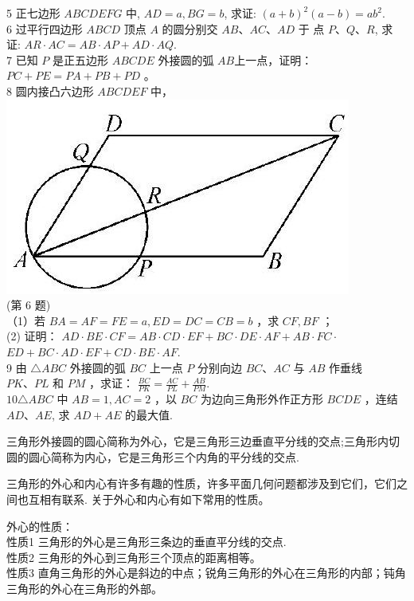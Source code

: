 \documentclass[10pt]{article}
\begin{document}
5 正七边形 $A B C D E F G$ 中, $A D=a, B G=b$, 求证: $(a+b)^{2}(a-b)=a b^{2}$.\\
6 过平行四边形 $A B C D$ 顶点 $A$ 的圆分别交 $A B 、 A C 、 A D$ 于 点 $P 、 Q 、 R$, 求 证: $A R \cdot A C=A B \cdot A P+A D \cdot A Q$.\\
7 已知 $P$ 是正五边形 $A B C D E$ 外接圆的弧 $A B$上一点，证明： $P C+P E=P A+P B+P D$ 。\\
8 圆内接凸六边形 $A B C D E F$ 中，\\
\includegraphics[max width=\textwidth, center]{2024_10_30_66b8e5e701da2093c133g-070}\\
(第 6 题)\\
（1）若 $B A=A F=F E=a, E D=D C=C B=b$ ，求 $C F, B F$ ；\\
(2) 证明： $A D \cdot B E \cdot C F=A B \cdot C D \cdot E F+B C \cdot D E \cdot A F+A B \cdot F C \cdot$ $E D+B C \cdot A D \cdot E F+C D \cdot B E \cdot A F$.\\
9 由 $\triangle A B C$ 外接圆的弧 $B C$ 上一点 $P$ 分别向边 $B C 、 A C$ 与 $A B$ 作垂线 $P K 、 P L$ 和 $P M$ ，求证： $\frac{B C}{P K}=\frac{A C}{P L}+\frac{A B}{P M}$.\\
$10 \triangle A B C$ 中 $A B=1, A C=2$ ，以 $B C$ 为边向三角形外作正方形 $B C D E$ ，连结 $A D 、 A E$, 求 $A D+A E$ 的最大值.

三角形外接圆的圆心简称为外心，它是三角形三边垂直平分线的交点;三角形内切圆的圆心简称为内心，它是三角形三个内角的平分线的交点.

三角形的外心和内心有许多有趣的性质，许多平面几何问题都涉及到它们，它们之间也互相有联系. 关于外心和内心有如下常用的性质。

外心的性质：\\
性质1 三角形的外心是三角形三条边的垂直平分线的交点.\\
性质2 三角形的外心到三角形三个顶点的距离相等。\\
性质3 直角三角形的外心是斜边的中点；锐角三角形的外心在三角形的内部；钝角三角形的外心在三角形的外部。
\end{document}
